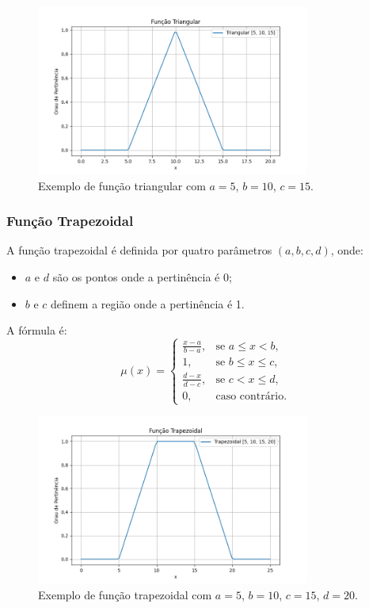 \documentclass[a4paper,12pt]{article}
\begin{document}
\begin{figure}[H]
    \centering
    \includegraphics[width=0.8\textwidth]{img/triangular.png}
    \caption{Exemplo de função triangular com $a=5$, $b=10$, $c=15$.}
    \label{fig:funcao_triangular}
\end{figure}

\subsubsection{Função Trapezoidal}
A função trapezoidal é definida por quatro parâmetros $(a, b, c, d)$, onde:
\begin{itemize}
    \item $a$ e $d$ são os pontos onde a pertinência é 0;
    \item $b$ e $c$ definem a região onde a pertinência é 1.
\end{itemize}
A fórmula é:
\[
\mu(x) =
\begin{cases}
\frac{x - a}{b - a}, & \text{se } a \leq x < b, \\
1, & \text{se } b \leq x \leq c, \\
\frac{d - x}{d - c}, & \text{se } c < x \leq d, \\
0, & \text{caso contrário.}
\end{cases}
\]
\begin{figure}[H]
    \centering
    \includegraphics[width=0.8\textwidth]{img/trapezoidal.png}
    \caption{Exemplo de função trapezoidal com $a=5$, $b=10$, $c=15$, $d=20$.}
    \label{fig:funcao_trapezoidal}
\end{figure}
\end{document}
